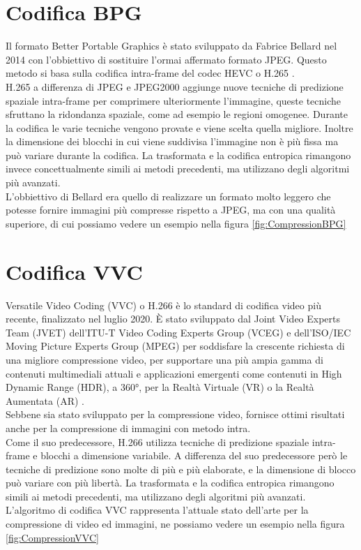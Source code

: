 \section{Codifica BPG}
Il formato Better Portable Graphics è stato sviluppato da Fabrice Bellard nel 2014 con l'obbiettivo di sostituire l’ormai affermato formato JPEG. Questo metodo si basa sulla codifica intra-frame del codec HEVC o H.265 \cite{BPGImageformat}.\\
H.265 a differenza di JPEG e JPEG2000 aggiunge nuove tecniche di predizione spaziale intra-frame per comprimere ulteriormente l’immagine, queste tecniche sfruttano la ridondanza spaziale, come ad esempio le regioni omogenee. Durante la codifica le varie tecniche vengono provate e viene scelta quella migliore. Inoltre la dimensione dei blocchi in cui viene suddivisa l’immagine non è più fissa ma può variare durante la codifica.
La trasformata e la codifica entropica rimangono invece concettualmente simili ai metodi precedenti, ma utilizzano degli algoritmi più avanzati.\\
L’obbiettivo di  Bellard era quello di realizzare un formato molto leggero che potesse fornire immagini più compresse rispetto a JPEG, ma con una qualità superiore, di cui possiamo vedere un esempio nella figura \ref{fig:CompressionBPG}

\section{Codifica VVC}
Versatile Video Coding (VVC) o H.266 è lo standard di codifica video più recente, finalizzato nel luglio 2020. È stato sviluppato dal Joint Video Experts Team (JVET) dell'ITU-T Video Coding Experts Group (VCEG) e dell'ISO/IEC Moving Picture Experts Group (MPEG) per soddisfare la crescente richiesta di una migliore compressione video, per supportare una più ampia gamma di contenuti multimediali attuali e applicazioni emergenti come contenuti in High Dynamic Range (HDR), a 360°, per la Realtà Virtuale (VR) o la Realtà Aumentata (AR) \cite{9503377}.\\
Sebbene sia stato sviluppato per la compressione video, fornisce ottimi risultati anche per la compressione di immagini con metodo intra.\\
Come il suo predecessore, H.266 utilizza tecniche di predizione spaziale intra-frame e blocchi a dimensione variabile. A differenza del suo predecessore però le tecniche di predizione sono molte di più e più elaborate, e la dimensione di blocco può variare con più libertà.
La trasformata e la codifica entropica rimangono simili ai metodi precedenti, ma utilizzano degli algoritmi più avanzati.\\
L’algoritmo di codifica VVC rappresenta l’attuale stato dell’arte per la compressione di video ed immagini, ne possiamo vedere un esempio nella figura \ref{fig:CompressionVVC}
\newline

